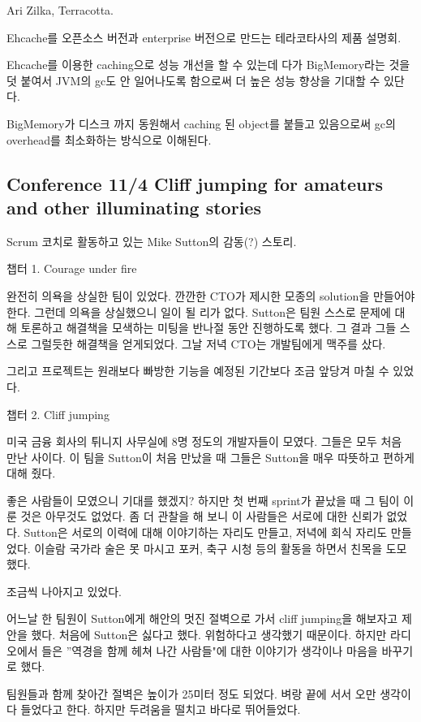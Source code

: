 \documentclass[a4paper]{article}
\begin{document}
Ari Zilka, Terracotta.
 
Ehcache를 오픈소스 버전과 enterprise 버전으로 만드는 테라코타사의 제품 설명회.
 
Ehcache를 이용한 caching으로 성능 개선을 할 수 있는데 다가 BigMemory라는 것을 덧 붙여서 JVM의  gc도 안 일어나도록 함으로써 더 높은 성능 향상을 기대할 수 있단다.
 
BigMemory가 디스크 까지 동원해서 caching 된 object를 붙들고 있음으로써  gc의  overhead를 최소화하는 방식으로 이해된다.
 
\subsection{Conference 11/4 Cliff jumping for amateurs and other illuminating stories}
 
Scrum 코치로 활동하고 있는 Mike Sutton의 감동(?) 스토리.
 
챕터 1. Courage under fire
 
완전히 의욕을 상실한 팀이 있었다. 깐깐한 CTO가 제시한 모종의 solution을 만들어야 한다.
그런데 의욕을 상실했으니 일이 될 리가 없다. Sutton은 팀원 스스로 문제에 대해 토론하고 해결책을 모색하는 미팅을 반나절 동안 진행하도록 했다. 그 결과 그들 스스로 그럴듯한 해결책을 얻게되었다. 그날 저녁 CTO는 개발팀에게 맥주를 샀다.
 
그리고 프로젝트는 원래보다 빠방한 기능을 예정된 기간보다 조금 앞당겨 마칠 수 있었다.
 
챕터 2. Cliff jumping
 
미국 금융 회사의 튀니지 사무실에 8명 정도의 개발자들이 모였다. 그들은 모두 처음 만난 사이다.  이 팀을 Sutton이 처음 만났을 때 그들은 Sutton을 매우 따뜻하고 편하게 대해 줬다. 
 
좋은 사람들이 모였으니 기대를 했겠지? 하지만 첫 번째 sprint가 끝났을 때 그 팀이 이룬 것은 아무것도 없었다. 좀 더 관찰을 해 보니 이 사람들은 서로에 대한 신뢰가 없었다. Sutton은 서로의 이력에 대해 이야기하는 자리도 만들고, 저녁에 회식 자리도 만들었다. 이슬람 국가라 술은 못 마시고 포커, 축구 시청 등의 활동을 하면서 친목을 도모했다.
 
조금씩 나아지고 있었다.
 
어느날 한 팀원이 Sutton에게 해안의 멋진 절벽으로 가서 cliff jumping을 해보자고 제안을 했다. 처음에 Sutton은 싫다고 했다. 위험하다고 생각했기 때문이다.  하지만 라디오에서 들은 ”역경을 함께 헤쳐 나간 사람들"에 대한 이야기가 생각이나 마음을 바꾸기로 했다.
 
팀원들과 함께 찾아간 절벽은 높이가 25미터 정도 되었다. 벼랑 끝에 서서 오만 생각이 다 들었다고 한다. 하지만 두려움을 떨치고 바다로 뛰어들었다.
 
\end{document}
